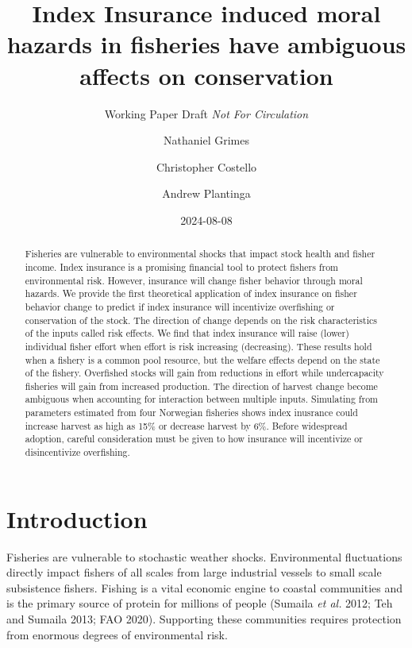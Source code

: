 \documentclass[
  letterpaper,
  DIV=11,
  numbers=noendperiod]{scrartcl}
\title{Index Insurance induced moral hazards in fisheries have ambiguous
affects on conservation}
\subtitle{Working Paper Draft \emph{Not For Circulation}}
\author{Nathaniel Grimes \and Christopher Costello \and Andrew
Plantinga}
\date{2024-08-08}
\renewcommand*\contentsname{Table of contents}
\newcommand\contentsname{Table of contents}
\theoremstyle{plain}
\theoremstyle{plain}
\theoremstyle{remark}
\begin{document}
\maketitle
\begin{abstract}
Fisheries are vulnerable to environmental shocks that impact stock
health and fisher income. Index insurance is a promising financial tool
to protect fishers from environmental risk. However, insurance will
change fisher behavior through moral hazards. We provide the first
theoretical application of index insurance on fisher behavior change to
predict if index insurance will incentivize overfishing or conservation
of the stock. The direction of change depends on the risk
characteristics of the inputs called risk effects. We find that index
insurance will raise (lower) individual fisher effort when effort is
risk increasing (decreasing). These results hold when a fishery is a
common pool resource, but the welfare effects depend on the state of the
fishery. Overfished stocks will gain from reductions in effort while
undercapacity fisheries will gain from increased production. The
direction of harvest change become ambiguous when accounting for
interaction between multiple inputs. Simulating from parameters
estimated from four Norwegian fisheries shows index inusrance could
increase harvest as high as 15\% or decrease harvest by 6\%. Before
widespread adoption, careful consideration must be given to how
insurance will incentivize or disincentivize overfishing.
\end{abstract}
\ifdefined\Shaded\renewenvironment{Shaded}{\begin{tcolorbox}[borderline west={3pt}{0pt}{shadecolor}, frame hidden, boxrule=0pt, interior hidden, enhanced, breakable, sharp corners]}{\end{tcolorbox}}\fi

\renewcommand*\contentsname{Table of contents}
{
\hypersetup{linkcolor=}
\setcounter{tocdepth}{3}
\tableofcontents
}
\hypertarget{introduction}{%
\section{Introduction}\label{introduction}}

Fisheries are vulnerable to stochastic weather shocks. Environmental
fluctuations directly impact fishers of all scales from large industrial
vessels to small scale subsistence fishers. Fishing is a vital economic
engine to coastal communities and is the primary source of protein for
millions of people (Sumaila \emph{et al.} 2012; Teh and Sumaila 2013;
FAO 2020). Supporting these communities requires protection from
enormous degrees of environmental risk.
\end{document}
